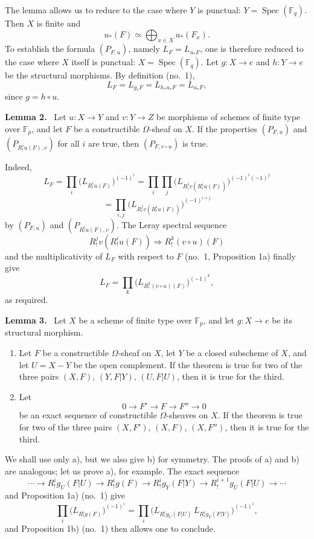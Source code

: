 \documentclass[11pt]{article}
\newenvironment{statement}[1]{\par\medskip\noindent\textbf{#1.}\ }{\par\medskip}
\DeclareMathOperator{\Spec}{Spec}
\providecommand{\Spec}{\operatorname{Spec}}
\providecommand{\Spec}{\operatorname{Spec}}
\providecommand{\Spec}{\operatorname{Spec}}
\providecommand{\Spec}{\operatorname{Spec}}
\begin{document}
The lemma allows us to reduce to the case where $Y$ is punctual: $Y=\Spec(\mathbb F_q)$. Then $X$ is finite and
\[
u_*(F)\simeq \bigoplus_{x\in X}u_*(F_x).
\]
To establish the formula $(P_{F,u})$, namely $L_F=L_{u_*F}$, one is therefore reduced to the case where $X$ itself is punctual: $X=\Spec(\mathbb F_q)$. Let $g:X\to e$ and $h:Y\to e$ be the structural morphisms. By definition (no.~1),
\[
L_F=L_{g_*F}=L_{h_*u_*F}=L_{u_*F},
\]
since $g=h\circ u$.

\begin{statement}{Lemma 2}
Let $u:X\to Y$ and $v:Y\to Z$ be morphisms of schemes of finite type over $\mathbb F_p$, and let $F$ be a constructible $\Omega$-sheaf on $X$. If the properties $(P_{F,u})$ and $(P_{R^i_!u(F),v})$ for all $i$ are true, then $(P_{F,v\circ u})$ is true.
\end{statement}

Indeed,
\[
L_F=\prod_i\bigl(L_{R^i_!u(F)}\bigr)^{(-1)^i}
 =\prod_i\prod_j\bigl(L_{R^j_!v(R^i_!u(F))}\bigr)^{(-1)^i(-1)^j}
\]
\[
=\prod_{i,j}\bigl(L_{R^j_!v(R^i_!u(F))}\bigr)^{(-1)^{i+j}}
\]
by $(P_{F,u})$ and $(P_{R^i_!u(F),v})$. The Leray spectral sequence
\[
R^j_!v(R^i_!u(F))\Longrightarrow R^k_!(v\circ u)(F)
\]
and the multiplicativity of $L_F$ with respect to $F$ (no.~1, Proposition 1a) finally give
\[
L_F=\prod_k\bigl(L_{R^k_!(v\circ u)(F)}\bigr)^{(-1)^k},
\]
as required.

\begin{statement}{Lemma 3}
Let $X$ be a scheme of finite type over $\mathbb F_p$, and let $g:X\to e$ be its structural morphism.
\begin{enumerate}[label=\alph*)]
\item Let $F$ be a constructible $\Omega$-sheaf on $X$, let $Y$ be a closed subscheme of $X$, and let $U=X-Y$ be the open complement. If the theorem is true for two of the three pairs $(X,F)$, $(Y,F|Y)$, $(U,F|U)$, then it is true for the third.
\item Let
\[
0\longrightarrow F'\longrightarrow F\longrightarrow F''\longrightarrow0
\]
be an exact sequence of constructible $\Omega$-sheaves on $X$. If the theorem is true for two of the three pairs $(X,F')$, $(X,F)$, $(X,F'')$, then it is true for the third.
\end{enumerate}
\end{statement}

We shall use only a), but we also give b) for symmetry. The proofs of a) and b) are analogous; let us prove a), for example. The exact sequence
\[
\cdots\longrightarrow R^i_!g_U(F|U)\longrightarrow R^i_!g(F)
\longrightarrow R^i_!g_Y(F|Y)\longrightarrow R^{i+1}_!g_U(F|U)\longrightarrow\cdots
\]
and Proposition 1a) (no.~1) give
\[
\prod_i\bigl(L_{R^i_!g(F)}\bigr)^{(-1)^i}
=\prod_i\bigl(L_{R^i_!g_U(F|U)}\,L_{R^i_!g_Y(F|Y)}\bigr)^{(-1)^i},
\]
and Proposition 1b) (no.~1) then allows one to conclude.
\end{document}
